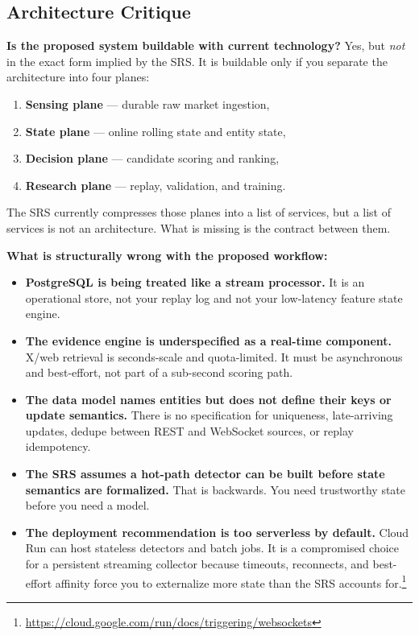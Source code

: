 \documentclass[11pt,letterpaper]{article}
\begin{document}
\subsection{Architecture Critique}

\textbf{Is the proposed system buildable with current technology?} Yes, but \emph{not} in the exact form implied by the SRS. It is buildable only if you separate the architecture into four planes:

\begin{enumerate}[nosep]
    \item \textbf{Sensing plane} --- durable raw market ingestion,
    \item \textbf{State plane} --- online rolling state and entity state,
    \item \textbf{Decision plane} --- candidate scoring and ranking,
    \item \textbf{Research plane} --- replay, validation, and training.
\end{enumerate}

The SRS currently compresses those planes into a list of services, but a list of services is not an architecture. What is missing is the contract between them.

\textbf{What is structurally wrong with the proposed workflow:}

\begin{itemize}[nosep]
    \item \textbf{PostgreSQL is being treated like a stream processor.} It is an operational store, not your replay log and not your low-latency feature state engine.
    \item \textbf{The evidence engine is underspecified as a real-time component.} X/web retrieval is seconds-scale and quota-limited. It must be asynchronous and best-effort, not part of a sub-second scoring path.
    \item \textbf{The data model names entities but does not define their keys or update semantics.} There is no specification for uniqueness, late-arriving updates, dedupe between REST and WebSocket sources, or replay idempotency.
    \item \textbf{The SRS assumes a hot-path detector can be built before state semantics are formalized.} That is backwards. You need trustworthy state before you need a model.
    \item \textbf{The deployment recommendation is too serverless by default.} Cloud Run can host stateless detectors and batch jobs. It is a compromised choice for a persistent streaming collector because timeouts, reconnects, and best-effort affinity force you to externalize more state than the SRS accounts for.\footnote{\url{https://cloud.google.com/run/docs/triggering/websockets}}
\end{itemize}
\end{document}
